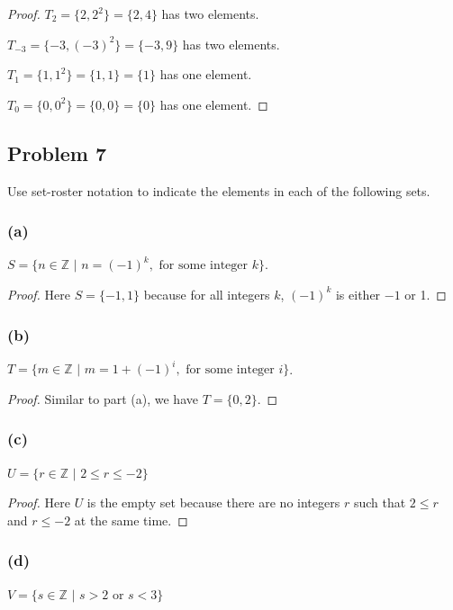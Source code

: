 \documentclass[14pt]{extarticle}
\newcommand{\Z}{\mathbb{Z}}
\begin{document}
\begin{proof}
    $T_2 = \{2, 2^2\} = \{2, 4\}$ has two elements.

    $T_{-3} = \{-3, (-3)^2\} = \{-3, 9\}$ has two elements.

    $T_1 = \{1, 1^2\} = \{1, 1\} = \{1\}$ has one element.

    $T_0 = \{0, 0^2\} = \{0, 0\} = \{0\}$ has one element.
\end{proof}

\subsection{Problem 7}
Use set-roster notation to indicate the elements in each of the following sets.

\subsubsection{(a)}
$S = \{n \in \Z \,\, | \,\, n = (-1)^k, \text{ for some integer } k\}$.

\begin{proof}
    Here $S = \{-1, 1\}$ because for all integers $k$, $(-1)^k$ is either $-1$ or 1.
\end{proof}

\subsubsection{(b)}
$T = \{m \in \Z \,\, | \,\, m = 1 + (-1)^i, \text{ for some integer } i\}$.

\begin{proof}
    Similar to part (a), we have $T = \{0, 2\}$.
\end{proof}

\subsubsection{(c)}
$U = \{r \in \Z \,\, | \,\, 2 \leq r \leq -2\}$

\begin{proof}
    Here $U$ is the empty set because there are no integers $r$ such that $2 \leq r$
    and $r \leq -2$ at the same time.
\end{proof}

\subsubsection{(d)}
$V = \{s \in \Z \,\, | \,\, s > 2 \text{ or } s < 3\}$
\end{document}
